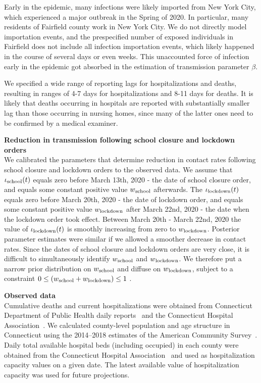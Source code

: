\documentclass[11pt]{article}
\begin{document}
Early in the epidemic, many infections were likely imported from New York City, which experienced a major outbreak in the Spring of 2020. In particular, many residents of Fairfield county work in New York City. We do not directly model importation events, and the prespecified number of exposed individuals in Fairfield does not include all infection importation events, which likely happened in the course of several days or even weeks. This unaccounted force of infection early in the epidemic got absorbed in the estimation of transmission parameter $\beta$.

We specified a wide range of reporting lags for hospitalizations and deaths, resulting in ranges of 4-7 days for hospitalizations and 8-11 days for deaths. It is likely that deaths occurring in hospitals are reported with substantially smaller lag than those occurring in nursing homes, since many of the latter ones need to be confirmed by a medical examiner.  

\textbf{Reduction in transmission following school closure and lockdown orders} \\[0.5em]
We calibrated the parameters that determine reduction in contact rates following school closure and lockdown orders to the observed data. 
We assume that $\iota\textsubscript{school}(t)$ equals zero before March 13th, 2020 - the date of school closure order, and equals some constant positive value $w\textsubscript{school}$ afterwards. 
The  $\iota\textsubscript{lockdown} (t)$ equals zero before March 20th, 2020 - the date of lockdown order, and equals some constant positive value $w\textsubscript{lockdown}$ after March 22nd, 2020 - the date when the lockdown order took effect. Between March 20th - March 22nd, 2020 the value of $\iota\textsubscript{lockdown} (t)$ is smoothly increasing from zero to $w\textsubscript{lockdown}$. Posterior parameter estimates were similar if we allowed a smoother decrease in contact rates.
Since the dates of school closure and lockdown orders are very close, it is difficult to simultaneously identify $w\textsubscript{school}$ and $w\textsubscript{lockdown}$. We therefore put a narrow prior distribution on $w\textsubscript{school}$ and diffuse on $w\textsubscript{lockdown}$, subject to a constraint $ 0 \le (w\textsubscript{school} + w\textsubscript{lockdown}) \le 1$ . 


\textbf{Observed data} \\[0.5em]
Cumulative deaths and current hospitalizations were obtained from Connecticut Department of Public Health daily reports~\citep{DPHwebsite} and the Connecticut Hospital Association~\citep{CHAwebsite}. 
We calculated county-level population and age structure in Connecticut using the 2014--2018 estimates of the American Community Survey~\citep{acs2018}. 
Daily total available hospital beds (including occupied) in each county were obtained from the Connecticut Hospital Association~\citep{CHAwebsite} and used as hospitalization capacity values on a given date. The latest available value of hospitalization capacity was used for future projections.
\end{document}

